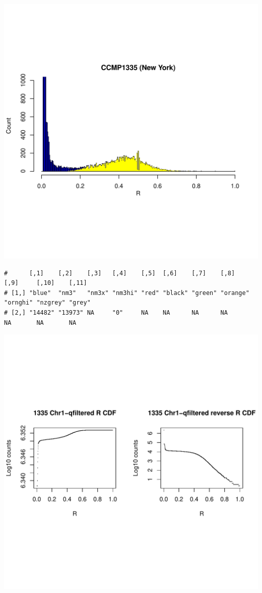\documentclass{article}\usepackage[]{graphicx}\usepackage[]{color}
\makeatletter
\def\maxwidth{ %
  \ifdim\Gin@nat@width>\linewidth
    \linewidth
  \else
    \Gin@nat@width
  \fi
}
\newenvironment{kframe}{%
 \def\at@end@of@kframe{}%
 \ifinner\ifhmode%
  \def\at@end@of@kframe{\end{minipage}}%
  \begin{minipage}{\columnwidth}%
 \fi\fi%
 \def\FrameCommand##1{\hskip\@totalleftmargin \hskip-\fboxsep
 \colorbox{shadecolor}{##1}\hskip-\fboxsep
     \hskip-\linewidth \hskip-\@totalleftmargin \hskip\columnwidth}%
 \MakeFramed {\advance\hsize-\width
   \@totalleftmargin\z@ \linewidth\hsize
   \@setminipage}}%
 {\par\unskip\endMakeFramed%
 \at@end@of@kframe}
\newenvironment{knitrout}{}{} %
\makeatother
\begin{document}
\begin{knitrout}
\includegraphics[width=\maxwidth]{FigS7-hwe-histo-figs-knitr/unnamed-chunk-10-55} 
\begin{kframe}\begin{verbatim}
#      [,1]    [,2]    [,3]   [,4]    [,5]  [,6]    [,7]    [,8]     [,9]     [,10]    [,11] 
# [1,] "blue"  "nm3"   "nm3x" "nm3hi" "red" "black" "green" "orange" "ornghi" "nzgrey" "grey"
# [2,] "14482" "13973" NA     "0"     NA    NA      NA      NA       NA       NA       NA
\end{verbatim}
\end{kframe}
\includegraphics[width=\maxwidth]{FigS7-hwe-histo-figs-knitr/unnamed-chunk-10-56} 

\end{knitrout}
\end{document}
